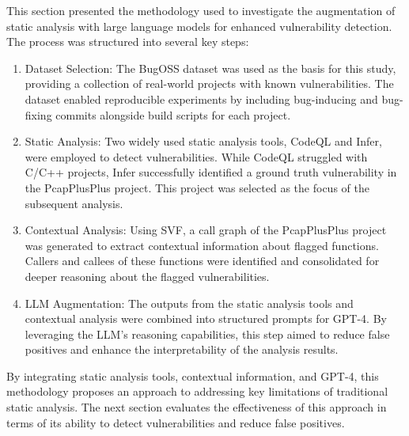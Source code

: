 This section presented the methodology used to investigate the augmentation of static analysis with large language models for enhanced vulnerability detection. The process was structured into several key steps:
\begin{enumerate}
    \item Dataset Selection: The BugOSS dataset was used as the basis for this study, providing a collection of real-world projects with known vulnerabilities. The dataset enabled reproducible experiments by including bug-inducing and bug-fixing commits alongside build scripts for each project.
    \item Static Analysis: Two widely used static analysis tools, CodeQL and Infer, were employed to detect vulnerabilities. While CodeQL struggled with C/C++ projects, Infer successfully identified a ground truth vulnerability in the PcapPlusPlus project. This project was selected as the focus of the subsequent analysis.
    \item Contextual Analysis: Using SVF, a call graph of the PcapPlusPlus project was generated to extract contextual information about flagged functions. Callers and callees of these functions were identified and consolidated for deeper reasoning about the flagged vulnerabilities.
    \item LLM Augmentation: The outputs from the static analysis tools and contextual analysis were combined into structured prompts for GPT-4. By leveraging the LLM's reasoning capabilities, this step aimed to reduce false positives and enhance the interpretability of the analysis results.
\end{enumerate}

By integrating static analysis tools, contextual information, and GPT-4, this methodology proposes an approach to addressing key limitations of traditional static analysis. The next section evaluates the effectiveness of this approach in terms of its ability to detect vulnerabilities and reduce false positives.